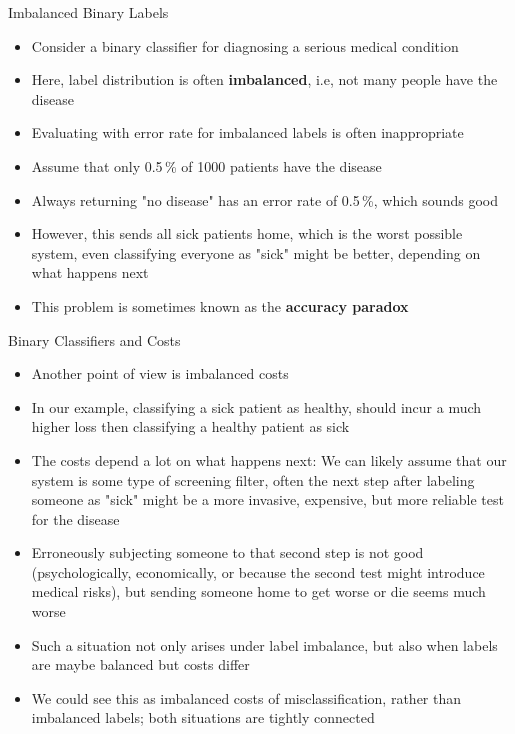 \documentclass[11pt,compress,t,notes=noshow, xcolor=table]{beamer}
\begin{document}
 \begin{vbframe}{Imbalanced Binary Labels}
 \begin{itemize}
   \item Consider a binary classifier for diagnosing a serious medical condition
   \item Here, label distribution is often \textbf{imbalanced}, i.e, not many people have the disease
   \item Evaluating with error rate for imbalanced labels is often inappropriate
   \item Assume that only 0.5\,\% of 1000 patients have the disease
   \item Always returning "no disease" has an error rate of 0.5\,\%, which sounds good
   \item However, this sends all sick patients home, which is the worst possible system, even classifying everyone as "sick" might be better, depending on what happens next
   \item This problem is sometimes known as the \textbf{accuracy paradox}
 \end{itemize}
 \end{vbframe}
 
 \begin{vbframe}{Binary Classifiers and Costs}
 \begin{itemize}
   \item Another point of view is imbalanced costs
   \item In our example, classifying a sick patient as healthy, should incur a much higher loss then classifying a healthy patient as sick
   \item The costs depend a lot on what happens next: We can likely assume that our system is some type of screening filter,
     often the next step after labeling someone as "sick" might be a more invasive, expensive, but more reliable test for the disease
   \item Erroneously subjecting someone to that second step is not good (psychologically, economically, or because the second test might introduce
     medical risks), but sending someone home to get worse or die seems much worse
   \item Such a situation not only arises under label imbalance, but also when labels are maybe balanced but costs differ
   \item We could see this as imbalanced costs of misclassification, rather than imbalanced labels; both situations are tightly connected
 \end{itemize}
 \end{vbframe}
 
\end{document}
